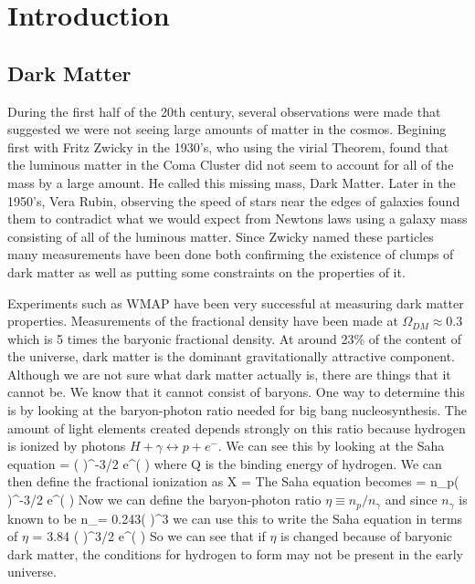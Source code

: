 %

\section{Introduction}
  
\subsection{Dark Matter} %
  During the first half of the 20th century, several observations were made that suggested we were not seeing large amounts of matter in the cosmos.
Begining first with Fritz Zwicky in the 1930's, who using the virial Theorem, found that the luminous matter in the Coma Cluster did not seem to account 
for all of the mass by a large amount. He called this missing mass, Dark Matter. Later in the 1950's, Vera Rubin, observing the speed of stars near the edges of
galaxies found them to contradict what we would expect from Newtons laws using a galaxy mass consisting of all of the luminous matter. Since Zwicky named these particles
many measurements have been done both confirming the existence of clumps of dark matter as well as putting some constraints on the properties of it.

Experiments such as WMAP have been very successful at measuring dark matter properties. Measurements of the fractional density have been made at $\Omega_{DM} \approx 0.3$ 
\cite{wmap} which is 5 times the baryonic fractional density. At around 23\% of the content of the universe, dark matter is the dominant gravitationally attractive component. Although 
we are not sure what dark matter actually is, there are things that it cannot be. We know that it cannot consist of baryons. One way to determine this is by looking at 
the baryon-photon ratio needed for big bang nucleosynthesis. The amount of light elements created depends strongly on this ratio because hydrogen is ionized by photons 
$H + \gamma \leftrightarrow p + e^-$. We can see this by looking at the Saha equation
\beq
     = \left( \right)^{-3/2}  e^{\left(   \right)}
\eeq 
where Q is the binding energy of hydrogen. We can then define the fractional ionization as
\beq
    X = 
\eeq
The Saha equation becomes
\beq
     = n_p\left(    \right)^{-3/2} e^{\left(   \right)}
\eeq
Now we can define the baryon-photon ratio $ \eta \equiv n_p / n_\gamma$ and since $n_\gamma$ is known to be
\beq
    n_\gamma = 0.243\left(   \right)^3
\eeq
we can use this to write the Saha equation in terms of $\eta$
\beq
     = 3.84 \eta \left(    \right)^{3/2} e^{\left(   \right)}
\eeq
So we can see that if $\eta$ is changed because of baryonic dark matter, the conditions for hydrogen to form may not be present in the early universe.


